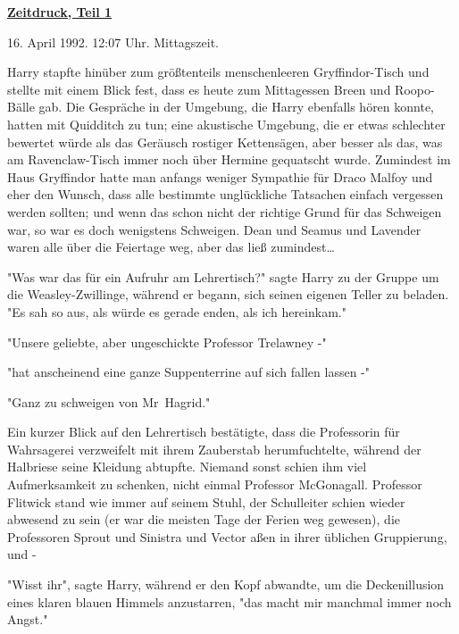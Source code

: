 

\hypertarget{zeitdruck-teil-1}{%

\textbf{\uline{Zeitdruck, Teil 1}}

16. April 1992. 12:07 Uhr. Mittagszeit.

Harry stapfte hinüber zum größtenteils menschenleeren Gryffindor-Tisch und stellte mit einem Blick fest, dass es heute zum Mittagessen Breen und Roopo-Bälle gab. Die Gespräche in der Umgebung, die Harry ebenfalls hören konnte, hatten mit Quidditch zu tun; eine akustische Umgebung, die er etwas schlechter bewertet würde als das Geräusch rostiger Kettensägen, aber besser als das, was am Ravenclaw-Tisch immer noch über Hermine gequatscht wurde. Zumindest im Haus Gryffindor hatte man anfangs weniger Sympathie für Draco Malfoy und eher den Wunsch, dass alle bestimmte unglückliche Tatsachen einfach vergessen werden sollten; und wenn das schon nicht der richtige Grund für das Schweigen war, so war es doch wenigstens Schweigen. Dean und Seamus und Lavender waren alle über die Feiertage weg, aber das ließ zumindest…

"Was war das für ein Aufruhr am Lehrertisch?" sagte Harry zu der Gruppe um die Weasley-Zwillinge, während er begann, sich seinen eigenen Teller zu beladen. "Es sah so aus, als würde es gerade enden, als ich hereinkam."

"Unsere geliebte, aber ungeschickte Professor Trelawney -"

"hat anscheinend eine ganze Suppenterrine auf sich fallen lassen -"

"Ganz zu schweigen von Mr~Hagrid."

Ein kurzer Blick auf den Lehrertisch bestätigte, dass die Professorin für Wahrsagerei verzweifelt mit ihrem Zauberstab herumfuchtelte, während der Halbriese seine Kleidung abtupfte. Niemand sonst schien ihm viel Aufmerksamkeit zu schenken, nicht einmal Professor McGonagall. Professor Flitwick stand wie immer auf seinem Stuhl, der Schulleiter schien wieder abwesend zu sein (er war die meisten Tage der Ferien weg gewesen), die Professoren Sprout und Sinistra und Vector aßen in ihrer üblichen Gruppierung, und -

"Wisst ihr", sagte Harry, während er den Kopf abwandte, um die Deckenillusion eines klaren blauen Himmels anzustarren, "das macht mir manchmal immer noch Angst."

}
